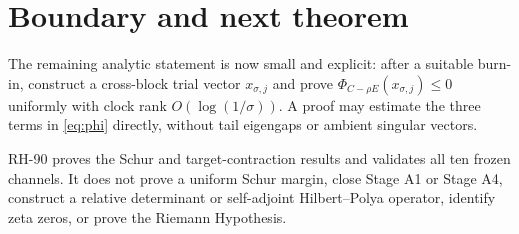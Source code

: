 \documentclass[11pt]{article}
\theoremstyle{remark}
\begin{document}
\section{Boundary and next theorem}

The remaining analytic statement is now small and explicit: after a suitable
burn-in, construct a cross-block trial vector $x_{\sigma,j}$ and prove
$\Phi_{C-\rho E}(x_{\sigma,j})\le0$ uniformly with clock rank
$O(\log(1/\sigma))$.  A proof may estimate the three terms in
\eqref{eq:phi} directly, without tail eigengaps or ambient singular vectors.

RH-90 proves the Schur and target-contraction results and validates all ten
frozen channels.  It does not prove a uniform Schur margin, close Stage A1 or
Stage A4, construct a relative determinant or self-adjoint Hilbert--Polya
operator, identify zeta zeros, or prove the Riemann Hypothesis.



\end{document}
